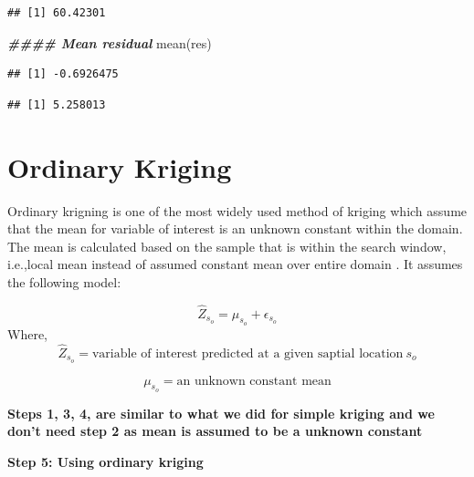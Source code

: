 \documentclass[
]{book}
\newenvironment{Shaded}{\begin{snugshade}}{\end{snugshade}}
\newcommand{\DecValTok}[1]{\textcolor[rgb]{0.00,0.00,0.81}{#1}}
\newcommand{\DocumentationTok}[1]{\textcolor[rgb]{0.56,0.35,0.01}{\textbf{\textit{#1}}}}
\newcommand{\FunctionTok}[1]{\textcolor[rgb]{0.00,0.00,0.00}{#1}}
\newcommand{\NormalTok}[1]{#1}
\newcommand{\SpecialCharTok}[1]{\textcolor[rgb]{0.00,0.00,0.00}{#1}}
\begin{document}
\begin{verbatim}
## [1] 60.42301
\end{verbatim}

\begin{Shaded}
\begin{Highlighting}[]
\DocumentationTok{\#\#\#\# Mean residual}
\FunctionTok{mean}\NormalTok{(res)}
\end{Highlighting}
\end{Shaded}

\begin{verbatim}
## [1] -0.6926475
\end{verbatim}

\begin{Shaded}
\end{Shaded}

\begin{verbatim}
## [1] 5.258013
\end{verbatim}

\hypertarget{ordinary-kriging}{%
\section{Ordinary Kriging}\label{ordinary-kriging}}

Ordinary krigning \citep{matheron_intrinsic_1973} is one of the most widely used method of kriging which assume that the mean for variable of interest is an unknown constant within the domain. The mean is calculated based on the sample that is within the search window, i.e.,local mean instead of assumed constant mean over entire domain \citep{clark_practical_2007} \citep{goovaerts_kriging_2008}. It assumes the following model:

\[\hat{Z}_{s_o}=\mu_{s_o} + \epsilon_{s_o}\]
Where, \[\hat{Z}_{s_o}=\text{variable of interest predicted at a given saptial location}\ s_{o}\]

\[\mu_{s_o}=\text{an unknown constant mean}\]

\textbf{Steps 1, 3, 4, are similar to what we did for simple kriging and we don't need step 2 as mean is assumed to be a unknown constant}

\textbf{Step 5: Using ordinary kriging}
\end{document}
